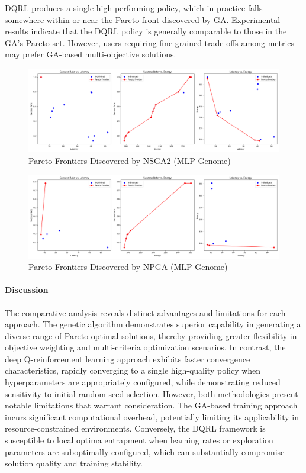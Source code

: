 \documentclass[preprint,12pt]{elsarticle}
\begin{document}
DQRL produces a single high-performing policy, which in practice falls somewhere within or near the Pareto front discovered by GA. Experimental results indicate that the DQRL policy is generally comparable to those in the GA’s Pareto set. However, users requiring fine-grained trade-offs among metrics may prefer GA-based multi-objective solutions.

\begin{figure}[H]
    \centering
    \includegraphics[width=0.9\linewidth]{figs/pareto_frontiers_nsga2.png}
    \caption{Pareto Frontiers Discovered by NSGA2 (MLP Genome)}
    \label{fig:nsga2-pareto-frontiers}
\end{figure}

\begin{figure}[H]
    \centering
    \includegraphics[width=0.9\linewidth]{figs/pareto_frontiers_npga.png}
    \caption{Pareto Frontiers Discovered by NPGA (MLP Genome)}
    \label{fig:npga-pareto-frontiers}
\end{figure}

\paragraph{Discussion}
The comparative analysis reveals distinct advantages and limitations for each approach. The genetic algorithm demonstrates superior capability in generating a diverse range of Pareto-optimal solutions, thereby providing greater flexibility in objective weighting and multi-criteria optimization scenarios. In contrast, the deep Q-reinforcement learning approach exhibits faster convergence characteristics, rapidly converging to a single high-quality policy when hyperparameters are appropriately configured, while demonstrating reduced sensitivity to initial random seed selection. However, both methodologies present notable limitations that warrant consideration. The GA-based training approach incurs significant computational overhead, potentially limiting its applicability in resource-constrained environments. Conversely, the DQRL framework is susceptible to local optima entrapment when learning rates or exploration parameters are suboptimally configured, which can substantially compromise solution quality and training stability.
\end{document}
